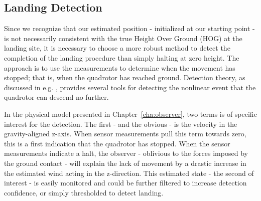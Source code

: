         \subsection{Landing Detection}
        \label{ssec:logic:landing:detection}
            Since we recognize that our estimated position - initialized at our starting point -
            is not necessarily consistent with the true Height Over Ground (HOG)
            at the landing site, it is necessary to choose a more robust
            method to detect the completion of the landing procedure than simply halting at zero height.
            The approach is to use the measurements to determine when the movement
            has stopped; that is, when the quadrotor has reached ground.
            Detection theory, as discussed in e.g. \citep{Tornqvist08,nyberg11diagnosis},
            provides several tools for detecting the nonlinear event that
            the quadrotor can descend no further.

            In the physical model presented in Chapter~\ref{cha:observer},
            two terms is of specific interest for the detection.
            The first - and the obvious - is the velocity in the gravity-aligned z-axis.
            When sensor measurements pull this term towards zero,
            this is a first indication that the quadrotor has stopped.
            When the sensor measurements indicate a halt, the
            observer - oblivious to the forces imposed by the
            ground contact - will explain the lack of movement by a drastic increase in
            the estimated wind acting in the z-direction.
            This estimated state - the second of interest - is easily monitored
            and could be further filtered to increase detection confidence,
            or simply thresholded to detect landing.
